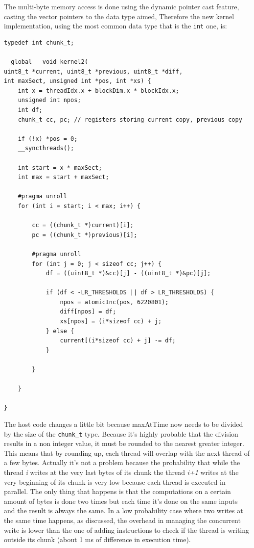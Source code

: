 \documentclass[paper=a4, fontsize=10pt]{scrartcl}	%
\begin{document}
	The multi-byte memory access is done using the dynamic pointer cast feature, casting the vector pointers to the data type aimed, Therefore the new kernel implementation, using the most common data type that is the \texttt{int} one, is:

	\begin{lstlisting}[style=CStyle]
typedef int chunk_t;

__global__ void kernel2(
uint8_t *current, uint8_t *previous, uint8_t *diff, 
int maxSect, unsigned int *pos, int *xs) {
    int x = threadIdx.x + blockDim.x * blockIdx.x;
    unsigned int npos;
    int df;
    chunk_t cc, pc; // registers storing current copy, previous copy

    if (!x) *pos = 0;
    __syncthreads();

    int start = x * maxSect;
    int max = start + maxSect;

    #pragma unroll
    for (int i = start; i < max; i++) {

        cc = ((chunk_t *)current)[i];
        pc = ((chunk_t *)previous)[i];

        #pragma unroll
        for (int j = 0; j < sizeof cc; j++) {
            df = ((uint8_t *)&cc)[j] - ((uint8_t *)&pc)[j];

            if (df < -LR_THRESHOLDS || df > LR_THRESHOLDS) {
                npos = atomicInc(pos, 6220801);
                diff[npos] = df;
                xs[npos] = (i*sizeof cc) + j;
            } else {
                current[(i*sizeof cc) + j] -= df;
            }

        }

    }

}
	\end{lstlisting}

	The host code changes a little bit because maxAtTime now needs to be divided by the size of the \texttt{chunk\_t} type. Because it's highly probable that the division results in a non integer value, it must be rounded to the nearest greater integer. \\
	
	This means that by rounding up, each thread will overlap with the next thread of a few bytes. Actually it's not a problem because the probability that while the thread \textit{i} writes at the very last bytes of its chunk the thread \textit{i+1} writes at the very beginning of its chunk is very low because each thread is executed in parallel. The only thing that happens is that the computations on a certain amount of bytes is done two times but each time it's done on the same inputs and the result is always the same. In a low probability case where two writes at the same time happens, as discussed, the overhead in managing the concurrent write is lower than the one of adding instructions to check if the thread is writing outside its chunk (about 1 ms of difference in execution time).\\
\end{document}
